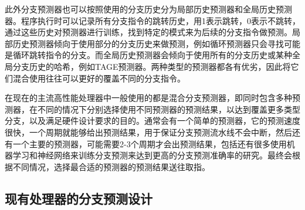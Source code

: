 此外分支预测器也可以按照使用的分支历史分为局部历史预测器和全局历史预测器。程序执行时可以记录所有分支指令的跳转历史，用1表示跳转，0表示不跳转，通过这些历史对预测器进行训练，找到特定的模式来为后续的分支指令做预测。局部历史预测器倾向于使用部分的分支历史来做预测，例如循环预测器只会寻找可能是循环跳转指令的分支。而全局历史预测器会倾向于使用所有的分支历史或某种全局分支历史的哈希，例如TAGE预测器。两种类型的预测器都各有优劣，因此将它们混合使用往往可以更好的覆盖不同的分支指令。

在现在的主流高性能处理器中一般使用的都是混合分支预测器，即同时包含多种预测器，在不同的情况下分别选择使用不同预测器的预测结果，以达到覆盖更多类型分支，以及满足硬件设计要求的目的。通常会有一个简单的预测器，它的预测速度很快，一个周期就能够给出预测结果，用于保证分支预测流水线不会中断，然后还有一个主要的预测器，可能需要2-3个周期才会出预测结果，包括还有很多使用机器学习和神经网络来训练分支预测来达到更高的分支预测准确率的研究。最终会根据不同情况，选择最合适的预测器的预测结果送往取指。

\subsection{现有处理器的分支预测设计}


